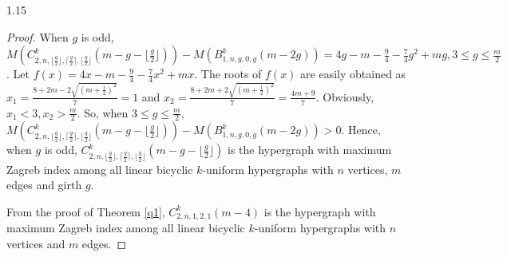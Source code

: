 \documentclass[preprint,12pt]{elsarticle1}
\numberwithin{equation}{section}
\begin{document}
\begin{spacing}{1.15}
\begin{proof}
When $g$ is odd,
$M(C_{2,n,\lfloor\frac{g}{2}\rfloor,\lceil\frac{g}{2}\rceil,\lfloor\frac{g}{2}\rfloor}^{k}(m-g-\lfloor\frac{g}{2}\rfloor))-M(B_{1,n,g,0,g}^{k}(m-2g))=4g-m-\frac{9}{4}-\frac{7}{4}g^{2}+mg, 3\leq g\leq \frac{m}{2}$.
Let $f(x)=4x-m-\frac{9}{4}-\frac{7}{4}x^{2}+mx$. 
The roots of $f(x)$ are easily obtained as $x_{1}=\frac{8+2m-2\sqrt{(m+\frac{1}{2})^{2}}}{7}=1$ and $x_{2}=\frac{8+2m+2\sqrt{(m+\frac{1}{2})^{2}}}{7}=\frac{4m+9}{7}$. Obviously,
$x_{1}<3, x_{2}>\frac{m}{2}.$ So, when $3\leq g\leq \frac{m}{2}$, $M(C_{2,n,\lfloor\frac{g}{2}\rfloor,\lceil\frac{g}{2}\rceil,\lfloor\frac{g}{2}\rfloor}^{k}(m-g-\lfloor\frac{g}{2}\rfloor))-M(B_{1,n,g,0,g}^{k}(m-2g))>0.$
Hence, when $g$ is odd, $C_{2,n,\lfloor\frac{g}{2}\rfloor,\lceil\frac{g}{2}\rceil,\lfloor\frac{g}{2}\rfloor}^{k}(m-g-\lfloor\frac{g}{2}\rfloor)$ is the hypergraph with maximum Zagreb index among all linear bicyclic $k$-uniform hypergraphs with $n$ vertices, $m$ edges and girth $g$.

From the proof of Theorem \ref{q1}, %
$C_{2,n,1,2,1}^{k}(m-4)$ is the hypergraph with maximum Zagreb index among all linear bicyclic $k$-uniform hypergraphs with $n$ vertices and $m$ edges.
\end{proof}



\end{spacing}
\end{document}
